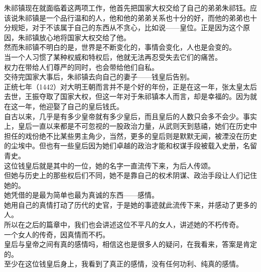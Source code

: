 \begin{multicols}{\theparacolNo}
朱祁镇现在就面临着这两项工作，他首先把国家大权交给了自己的弟弟朱祁钰。应该说朱祁镇是一个品行温和的人，他和他的弟弟关系也十分的好，而他的弟弟也十分规矩，对于不该属于自己的东西从不贪心，比如说——皇位。正是因为这个原因，朱祁镇放心地将国家大权交给了他。\\

然而朱祁镇不明白的是，世界是不断变化的，事情会变化，人也是会变的。\\

当一个人习惯了某种权威和特权后，他就无法再忍受失去它们的痛苦。\\

权力在带给人们尊严的同时，也会带给他们自私。\\

交待完国家大事后，朱祁镇去向自己的妻子——钱皇后告别。\\

正统七年（1442）对大明王朝而言并不是个好的年份，正是在这一年，张太皇太后去世，王振夺取了国家大权，但这一年对于朱祁镇本人而言，却是幸福的。因为就在这一年，他迎娶了自己的皇后钱氏。\\

自古以来，几乎是有多少皇帝就有多少皇后，而且皇后的人数只会多不会少。事实上，皇后一直以来都是不可忽视的一股政治力量，从武则天到慈禧，她们在历史中担任的戏份绝不比某些男主角少，当然，更多的皇后则是默默无闻，被湮没在历史的尘埃中。但也有一些皇后因为她们卓越的政治才能和权谋手段被载入史册，名留青史。\\

这位钱皇后就是其中的一位，她的名字一直流传下来，为后人传颂。\\

但她与历史上的那些权后们不同，她不是靠自己的权术阴谋、政治手段让人们记住她的。\\

她凭借的是最为简单也最为真诚的东西——感情。\\

她用自己的真情打动了历代的史官，于是她的事迹就此流传下来，并感动了更多的人。\\

所以在之后的篇章中，我们也会讲述这位不平凡的女人，讲述她的不朽传奇。\\

一个女人的传奇，因真情而不朽。\\

皇后与皇帝之间有真的感情吗，相信这也是很多人的疑问，在我看来，答案是肯定的。\\

至少在这位钱皇后身上，我看到了真正的感情，没有任何功利、纯真的感情。\\


\end{multicols}
